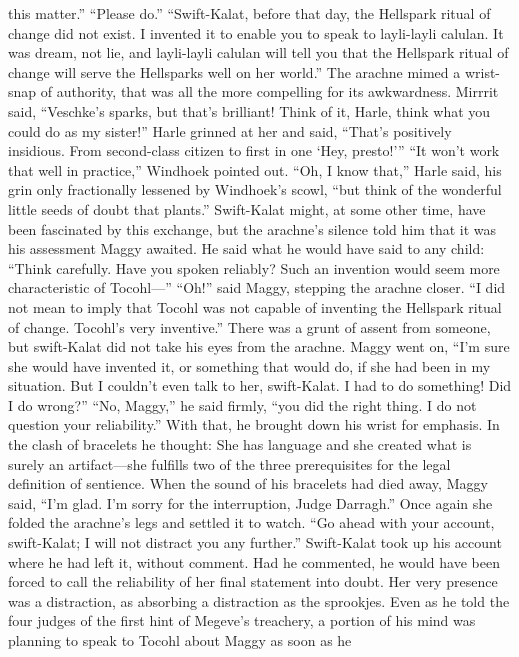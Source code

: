 \documentclass[9pt]{article}
\begin{document}
this matter.”
“Please do.”
“Swift-Kalat, before that day, the Hellspark ritual of change did not exist. I invented it to enable you
to speak to layli-layli calulan. It was dream, not lie, and layli-layli calulan will tell you that the
Hellspark ritual of change will serve the Hellsparks well on her world.” The arachne mimed a wrist-snap
of authority, that was all the more compelling for its awkwardness.
Mirrrit said, “Veschke’s sparks, but that’s brilliant! Think of it, Harle, think what you could do as my
sister!”
Harle grinned at her and said, “That’s positively insidious. From second-class citizen to first in one
‘Hey, presto!’”
“It won’t work that well in practice,” Windhoek pointed out.
“Oh, I know that,” Harle said, his grin only fractionally lessened by Windhoek’s scowl, “but think of
the wonderful little seeds of doubt that plants.”
Swift-Kalat might, at some other time, have been fascinated by this exchange, but the arachne’s
silence told him that it was his assessment Maggy awaited. He said what he would have said to any child:
“Think carefully. Have you spoken reliably? Such an invention would seem more characteristic of
Tocohl—”
“Oh!” said Maggy, stepping the arachne closer. “I did not mean to imply that Tocohl was not
capable of inventing the Hellspark ritual of change. Tocohl’s very inventive.” There was a grunt of assent
from someone, but swift-Kalat did not take his eyes from the arachne. Maggy went on, “I’m sure she
would have invented it, or something that would do, if she had been in my situation. But I couldn’t even
talk to her, swift-Kalat. I had to do something! Did I do wrong?”
“No, Maggy,” he said firmly, “you did the right thing. I do not question your reliability.” With that, he
brought down his wrist for emphasis. In the clash of bracelets he thought: She has language and she
created what is surely an artifact—she fulfills two of the three prerequisites for the legal definition of
sentience.
When the sound of his bracelets had died away, Maggy said, “I’m glad. I’m sorry for the
interruption, Judge Darragh.” Once again she folded the arachne’s legs and settled it to watch. “Go
ahead with your account, swift-Kalat; I will not distract you any further.”
Swift-Kalat took up his account where he had left it, without comment. Had he commented, he
would have been forced to call the reliability of her final statement into doubt. Her very presence was a
distraction, as absorbing a distraction as the sprookjes. Even as he told the four judges of the first hint of
Megeve’s treachery, a portion of his mind was planning to speak to Tocohl about Maggy as soon as he
\end{document}
